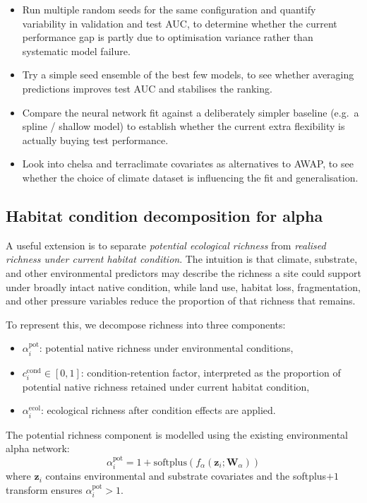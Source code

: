 \documentclass{article}
\begin{document}
\begin{itemize}
    \item Run multiple random seeds for the same configuration and quantify variability in validation and test AUC, to determine whether the current performance gap is partly due to optimisation variance rather than systematic model failure.
    \item Try a simple seed ensemble of the best few models, to see whether averaging predictions improves test AUC and stabilises the ranking.
    \item Compare the neural network fit against a deliberately simpler baseline (e.g.\ a spline / shallow model) to establish whether the current extra flexibility is actually buying test performance.
    \item Look into chelsa and terraclimate covariates as alternatives to AWAP, to see whether the choice of climate dataset is influencing the fit and generalisation.
\end{itemize}


\subsection{Habitat condition decomposition for alpha}
\label{sec:condition-decomposition}

A useful extension is to separate \emph{potential ecological richness} from \emph{realised richness under current habitat condition}. The intuition is that climate, substrate, and other environmental predictors may describe the richness a site could support under broadly intact native condition, while land use, habitat loss, fragmentation, and other pressure variables reduce the proportion of that richness that remains.

To represent this, we decompose richness into three components:
\begin{itemize}
    \item \(\alpha_i^{\mathrm{pot}}\): potential native richness under environmental conditions,
    \item \(c_i^{\mathrm{cond}} \in [0,1]\): condition-retention factor, interpreted as the proportion of potential native richness retained under current habitat condition,
    \item \(\alpha_i^{\mathrm{ecol}}\): ecological richness after condition effects are applied.
\end{itemize}

The potential richness component is modelled using the existing environmental alpha network:
\begin{equation}
    \alpha_i^{\mathrm{pot}}
    =
    1 + \mathrm{softplus}\!\left(f_\alpha(\mathbf{z}_i;\bm{W}_\alpha)\right)
\end{equation}
where \(\mathbf{z}_i\) contains environmental and substrate covariates and the softplus\(+1\) transform ensures \(\alpha_i^{\mathrm{pot}} > 1\).
\end{document}

